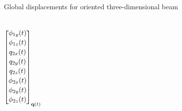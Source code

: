 \documentclass[aspectratio=169]{beamer}
\begin{document}
{\begin{frame}{Global displacements for oriented three-dimensional beam}
\begin{columns}
$${\begin{bmatrix}
            {\color{black} \phi_{1y}(t)   } \\[2pt]
            {\color{black} \phi_{1z}(t)}    \\[2pt]
            {\color{black} q_{2x}(t)}       \\[2pt]
            {\color{black} q_{2y}(t)}       \\[2pt]
            {\color{black} q_{2z}(t)}       \\[2pt]
            {\color{black} \phi_{2x}(t)}    \\[2pt]
            {\color{black} \phi_{2y}(t)   } \\[2pt]
            {\color{black} \phi_{2z}(t)}    \\[2pt]
          \end{bmatrix}}_\text{$\mathbf q(t)$}$$


\end{columns}
\end{frame}}
\end{document}

